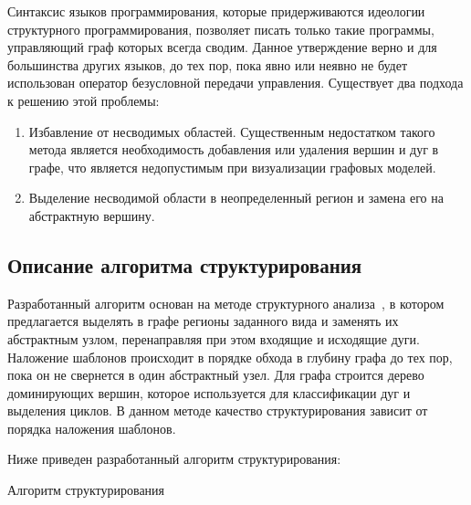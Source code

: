 \documentclass{jctart15a}
\begin{document}
Синтаксис языков программирования, которые придерживаются идеологии структурного программирования, позволяет писать только такие программы, управляющий граф которых всегда сводим. Данное утверждение верно и для большинства других языков, до тех пор, пока явно или неявно не будет использован оператор безусловной передачи управления. Существует два подхода к решению этой проблемы:
\begin{enumerate}
	\item	Избавление от несводимых областей. Существенным недостатком такого метода является необходимость добавления или удаления вершин и дуг в графе, что является недопустимым при визуализации графовых моделей.
	\item	Выделение несводимой области в неопределенный регион и замена его на абстрактную вершину.
\end{enumerate}


\subsection{Описание алгоритма структурирования}

	Разработанный алгоритм основан на методе структурного анализа~\cite{17}, в котором предлагается выделять в графе регионы заданного вида и заменять их абстрактным узлом, перенаправляя при этом входящие и исходящие дуги. Наложение шаблонов происходит в порядке обхода в глубину графа до тех пор, пока он не свернется в один абстрактный узел. Для графа строится дерево доминирующих вершин, которое используется для классификации дуг и выделения циклов. В данном методе качество структурирования зависит от порядка наложения шаблонов.

Ниже приведен разработанный алгоритм структурирования:

\begin{algorithm}[H]
\SetAlgoLined %
\caption{Алгоритм структурирования}
\label{alg:struct}
\end{algorithm}
\end{document}
